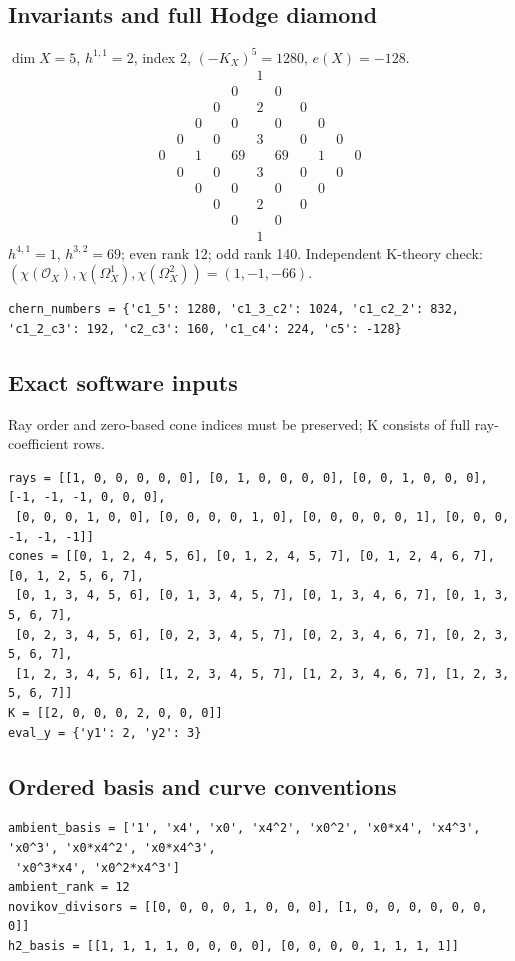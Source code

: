 \documentclass[10pt,a4paper]{article}
\begin{document}
\subsection*{Invariants and full Hodge diamond}
$\dim X=5$, $h^{1,1}=2$, index $2$, $(-K_X)^5=1280$, $e(X)=-128$.
\[\begin{array}{ccccccccccc}&&&&&1&&&&&\\&&&&0&&0&&&&\\&&&0&&2&&0&&&\\&&0&&0&&0&&0&&\\&0&&0&&3&&0&&0&\\0&&1&&69&&69&&1&&0\\&0&&0&&3&&0&&0&\\&&0&&0&&0&&0&&\\&&&0&&2&&0&&&\\&&&&0&&0&&&&\\&&&&&1&&&&&\end{array}\]
$h^{4,1}=1$, $h^{3,2}=69$; even rank 12; odd rank 140.
Independent K-theory check: $(\chi(\mathcal O_X),\chi(\Omega_X^1),\chi(\Omega_X^2))=(1, -1, -66)$.
\begin{lstlisting}
chern_numbers = {'c1_5': 1280, 'c1_3_c2': 1024, 'c1_c2_2': 832, 'c1_2_c3': 192, 'c2_c3': 160, 'c1_c4': 224, 'c5': -128}
\end{lstlisting}
\subsection*{Exact software inputs}
Ray order and zero-based cone indices must be preserved; K consists of full ray-coefficient rows.
\begin{lstlisting}
rays = [[1, 0, 0, 0, 0, 0], [0, 1, 0, 0, 0, 0], [0, 0, 1, 0, 0, 0], [-1, -1, -1, 0, 0, 0],
 [0, 0, 0, 1, 0, 0], [0, 0, 0, 0, 1, 0], [0, 0, 0, 0, 0, 1], [0, 0, 0, -1, -1, -1]]
cones = [[0, 1, 2, 4, 5, 6], [0, 1, 2, 4, 5, 7], [0, 1, 2, 4, 6, 7], [0, 1, 2, 5, 6, 7],
 [0, 1, 3, 4, 5, 6], [0, 1, 3, 4, 5, 7], [0, 1, 3, 4, 6, 7], [0, 1, 3, 5, 6, 7],
 [0, 2, 3, 4, 5, 6], [0, 2, 3, 4, 5, 7], [0, 2, 3, 4, 6, 7], [0, 2, 3, 5, 6, 7],
 [1, 2, 3, 4, 5, 6], [1, 2, 3, 4, 5, 7], [1, 2, 3, 4, 6, 7], [1, 2, 3, 5, 6, 7]]
K = [[2, 0, 0, 0, 2, 0, 0, 0]]
eval_y = {'y1': 2, 'y2': 3}
\end{lstlisting}
\subsection*{Ordered basis and curve conventions}
\begin{lstlisting}
ambient_basis = ['1', 'x4', 'x0', 'x4^2', 'x0^2', 'x0*x4', 'x4^3', 'x0^3', 'x0*x4^2', 'x0*x4^3',
 'x0^3*x4', 'x0^2*x4^3']
ambient_rank = 12
novikov_divisors = [[0, 0, 0, 0, 1, 0, 0, 0], [1, 0, 0, 0, 0, 0, 0, 0]]
h2_basis = [[1, 1, 1, 1, 0, 0, 0, 0], [0, 0, 0, 0, 1, 1, 1, 1]]
\end{lstlisting}
\end{document}
